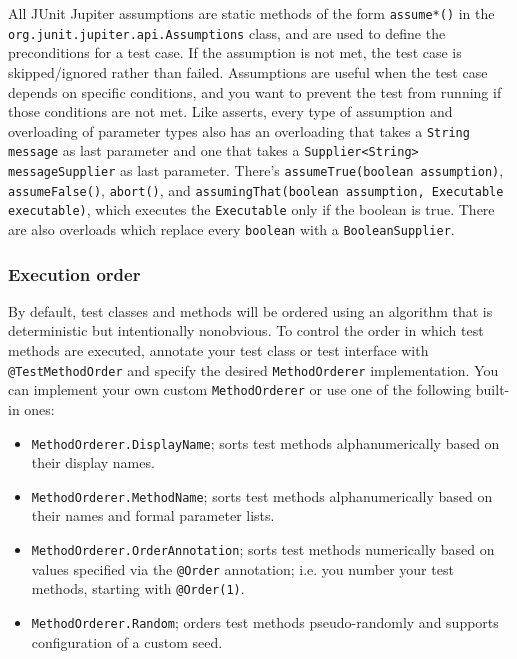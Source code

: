 \documentclass[table, xcdraw]{article}%
\begin{document}
All JUnit Jupiter assumptions are static methods of the form \texttt{assume*()} in the \texttt{org.junit.jupiter.api.Assumptions} class, and are used to define the preconditions for a test case. If the assumption is not met, the test case is skipped/ignored rather than failed. Assumptions are useful when the test case depends on specific conditions, and you want to prevent the test from running if those conditions are not met. Like asserts, every type of assumption and overloading of parameter types also has an overloading that takes a \texttt{String message} as last parameter and one that takes a \texttt{Supplier<String> messageSupplier} as last parameter. There's \texttt{assumeTrue(boolean assumption)}, \texttt{assumeFalse()}, \texttt{abort()}, and \texttt{assumingThat(boolean assumption, Executable executable)}, which executes the \texttt{Executable} only if the boolean is true. There are also overloads which replace every \texttt{boolean} with a \texttt{BooleanSupplier}.

\subsubsection{Execution order}

By default, test classes and methods will be ordered using an algorithm that is deterministic but intentionally nonobvious. To control the order in which test methods are executed, annotate your test class or test interface with \texttt{@TestMethodOrder} and specify the desired \texttt{MethodOrderer} implementation. You can implement your own custom \texttt{MethodOrderer} or use one of the following built-in ones:

\begin{itemize}
    \item \texttt{MethodOrderer.DisplayName}; sorts test methods alphanumerically based on their display names.
    \item \texttt{MethodOrderer.MethodName}; sorts test methods alphanumerically based on their names and formal parameter lists.
    \item \texttt{MethodOrderer.OrderAnnotation}; sorts test methods numerically based on values specified via the \texttt{@Order} annotation; i.e. you number your test methods, starting with \texttt{@Order(1)}.
    \item \texttt{MethodOrderer.Random}; orders test methods pseudo-randomly and supports configuration of a custom seed.
\end{itemize}
\end{document}

